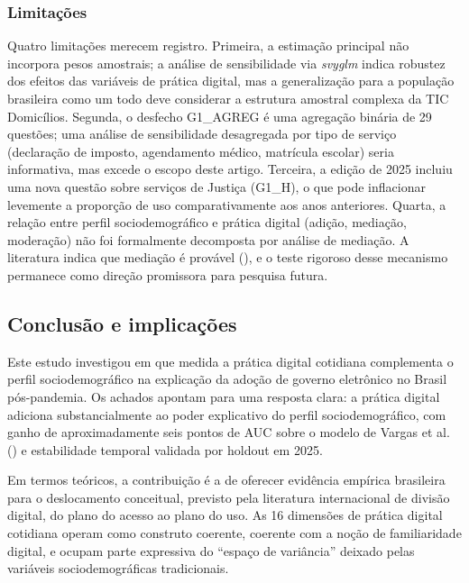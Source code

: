 \documentclass[
  man,
  floatsintext,
  longtable,
  a4paper,
  nolmodern,
  notxfonts,
  notimes,
  colorlinks=true,linkcolor=blue,citecolor=blue,urlcolor=blue]{apa7}
\begin{document}
\subsubsection{Limitações}\label{limitauxe7uxf5es}

Quatro limitações merecem registro. Primeira, a estimação principal não
incorpora pesos amostrais; a análise de sensibilidade via \emph{svyglm}
indica robustez dos efeitos das variáveis de prática digital, mas a
generalização para a população brasileira como um todo deve considerar a
estrutura amostral complexa da TIC Domicílios. Segunda, o desfecho
G1\_AGREG é uma agregação binária de 29 questões; uma análise de
sensibilidade desagregada por tipo de serviço (declaração de imposto,
agendamento médico, matrícula escolar) seria informativa, mas excede o
escopo deste artigo. Terceira, a edição de 2025 incluiu uma nova questão
sobre serviços de Justiça (G1\_H), o que pode inflacionar levemente a
proporção de uso comparativamente aos anos anteriores. Quarta, a relação
entre perfil sociodemográfico e prática digital (adição, mediação,
moderação) não foi formalmente decomposta por análise de mediação. A
literatura indica que mediação é provável
(), e o teste rigoroso
desse mecanismo permanece como direção promissora para pesquisa futura.

\subsection{Conclusão e
implicações}\label{conclusuxe3o-e-implicauxe7uxf5es}

Este estudo investigou em que medida a prática digital cotidiana
complementa o perfil sociodemográfico na explicação da adoção de governo
eletrônico no Brasil pós-pandemia. Os achados apontam para uma resposta
clara: a prática digital adiciona substancialmente ao poder explicativo
do perfil sociodemográfico, com ganho de aproximadamente seis pontos de
AUC sobre o modelo de Vargas et al. () e
estabilidade temporal validada por holdout em 2025.

Em termos teóricos, a contribuição é a de oferecer evidência empírica
brasileira para o deslocamento conceitual, previsto pela literatura
internacional de divisão digital, do plano do acesso ao plano do uso. As
16 dimensões de prática digital cotidiana operam como construto
coerente, coerente com a noção de familiaridade digital, e ocupam parte
expressiva do ``espaço de variância'' deixado pelas variáveis
sociodemográficas tradicionais.
\end{document}
